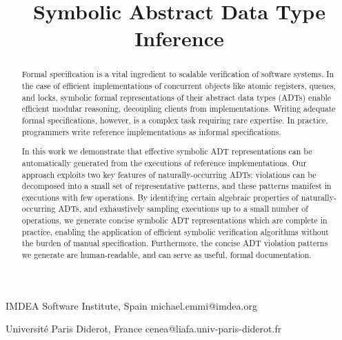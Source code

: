\documentclass[9pt,natbib,authoryear]{sigplanconf}
\begin{document}
\setlength{\pdfpageheight}{\paperheight}
\setlength{\pdfpagewidth}{\paperwidth}

\toappear{}





\title{Symbolic Abstract Data Type Inference}

           {IMDEA Software Institute, Spain}
           {michael.emmi@imdea.org}

           {Université Paris Diderot, France}
           {cenea@liafa.univ-paris-diderot.fr}

\maketitle

\begin{abstract}

  Formal specification is a vital ingredient to scalable verification of
  software systems. In the case of efficient implementations of concurrent
  objects like atomic registers, queues, and locks, symbolic formal
  representations of their abstract data types (ADTs) enable efficient modular
  reasoning, decoupling clients from implementations. Writing adequate formal
  specifications, however, is a complex task requiring rare expertise. In
  practice, programmers write reference implementations as informal
  specifications.

  In this work we demonstrate that effective symbolic ADT representations can
  be automatically generated from the executions of reference implementations.
  Our approach exploits two key features of naturally-occurring ADTs: violations
  can be decomposed into a small set of representative patterns, and these
  patterns manifest in executions with few operations. By identifying certain
  algebraic properties of naturally-occurring ADTs, and exhaustively sampling
  executions up to a small number of operations, we generate concise symbolic
  ADT representations which are complete in practice, enabling the application
  of efficient symbolic verification algorithms without the burden of manual
  specification. Furthermore, the concise ADT violation patterns we generate
  are human-readable, and can serve as useful, formal documentation.

\end{abstract}
\end{document}
